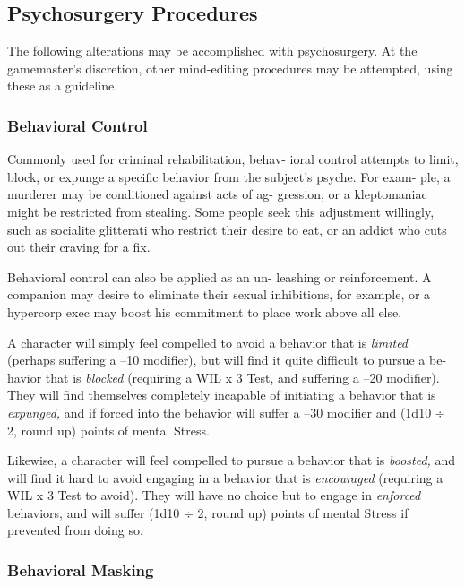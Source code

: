 \subsection{Psychosurgery Procedures}

The following alterations may be accomplished with 
psychosurgery. At the gamemaster's discretion, other 
mind-editing procedures may be attempted, using 
these as a guideline.

\subsubsection{Behavioral Control}

Commonly used for criminal rehabilitation, behav-
ioral control attempts to limit, block, or expunge a 
specific behavior from the subject's psyche. For exam-
ple, a murderer may be conditioned against acts of ag-
gression, or a kleptomaniac might be restricted from 
stealing. Some people seek this adjustment willingly, 
such as socialite glitterati who restrict their desire to 
eat, or an addict who cuts out their craving for a fix.

Behavioral control can also be applied as an un-
leashing or reinforcement. A companion may desire 
to eliminate their sexual inhibitions, for example, or 
a hypercorp exec may boost his commitment to place 
work above all else.

A character will simply feel compelled to avoid 
a behavior that is \textit{limited }(perhaps suffering a –10 
modifier), but will find it quite difficult to pursue a be-
havior that is \textit{blocked }(requiring a WIL x 3 Test, and 
suffering a –20 modifier). They will find themselves 
completely incapable of initiating a behavior that is 
\textit{expunged,} and if forced into the behavior will suffer 
a –30 modifier and (1d10 ÷ 2, round up) points of 
mental Stress.

Likewise, a character will feel compelled to pursue a 
behavior that is \textit{boosted,} and will find it hard to avoid 
engaging in a behavior that is \textit{encouraged }(requiring a 
WIL x 3 Test to avoid). They will have no choice but 
to engage in \textit{enforced }behaviors, and will suffer (1d10 
÷ 2, round up) points of mental Stress if prevented 
from doing so.

\subsubsection{Behavioral Masking}

